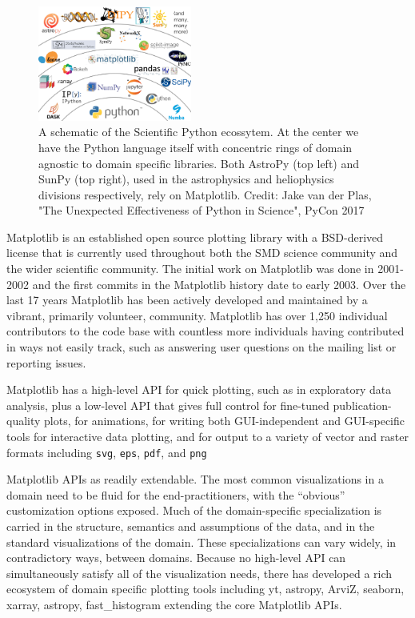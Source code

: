 \documentclass[12pt]{article}
\numberwithin{page}{section}
\begin{document}
\begin{figure}
  \includegraphics[width=0.45\textwidth]{scipy-ecosystem}
  \caption{A schematic of the Scientific Python ecossytem.  At the
    center we have the Python language itself with concentric rings of
    domain agnostic to domain specific libraries.  Both AstroPy (top
    left) and SunPy (top right), used in the astrophysics and
    heliophysics divisions respectively, rely on Matplotlib.
    Credit: Jake van der Plas, "The Unexpected Effectiveness of Python
    in Science", PyCon 2017}
  \label{fig:ecosystem}
\end{figure}



Matplotlib \cite{Hunter:2007} is an established open source plotting
library with a BSD-derived license that is currently used throughout
both the SMD science community and the wider scientific community.
The initial work on Matplotlib was done in 2001-2002 and the first
commits in the Matplotlib history date to early 2003.  Over the last
17 years Matplotlib has been actively developed and maintained by a
vibrant, primarily volunteer, community.  Matplotlib has over 1,250
individual contributors to the code base with countless more
individuals having contributed in ways not easily track, such as
answering user questions on the mailing list or reporting issues.

Matplotlib has a high-level API for quick plotting, such as in
exploratory data analysis, plus a low-level API that gives full control for
fine-tuned publication-quality plots, for animations, for writing both
GUI-independent and GUI-specific tools for interactive data plotting, and
for output to a variety of vector and raster
formats including \texttt{svg}, \texttt{eps},
\texttt{pdf}, and \texttt{png}

Matplotlib APIs as readily extendable.  The most common visualizations
in a domain need to be fluid for the end-practitioners, with the
``obvious'' customization options exposed. Much of the domain-specific
specialization is carried in the structure, semantics and assumptions
of the data, and in the standard visualizations of the domain. These
specializations can vary widely, in contradictory ways, between
domains. Because no high-level API can simultaneously satisfy all of
the visualization needs, there has developed a rich ecosystem of
domain specific plotting tools including yt, astropy, ArviZ,
seaborn, xarray, astropy, fast\_histogram extending the core
Matplotlib APIs.
\end{document}
